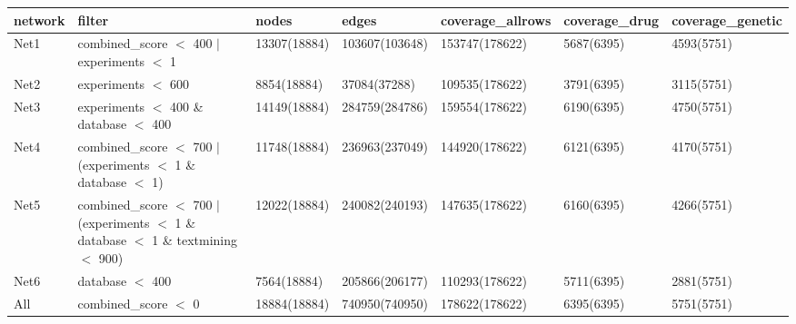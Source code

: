 \begin{table}[ht]
\centering
\begin{tabular}{lllllll}
  \hline
network & filter & nodes & edges & coverage\_allrows & coverage\_drug & coverage\_genetic \\ 
  \hline
Net1 & combined\_score $<$ 400 $|$ experiments $<$ 1 & 13307(18884) & 103607(103648) & 153747(178622) & 5687(6395) & 4593(5751) \\ 
  Net2 & experiments $<$ 600 & 8854(18884) & 37084(37288) & 109535(178622) & 3791(6395) & 3115(5751) \\ 
  Net3 & experiments $<$ 400 \& database $<$ 400 & 14149(18884) & 284759(284786) & 159554(178622) & 6190(6395) & 4750(5751) \\ 
  Net4 & combined\_score $<$ 700 $|$ (experiments $<$ 1 \& database $<$ 1) & 11748(18884) & 236963(237049) & 144920(178622) & 6121(6395) & 4170(5751) \\ 
  Net5 & combined\_score $<$ 700 $|$ (experiments $<$ 1 \& database $<$ 1 \& textmining $<$ 900) & 12022(18884) & 240082(240193) & 147635(178622) & 6160(6395) & 4266(5751) \\ 
  Net6 & database $<$ 400 & 7564(18884) & 205866(206177) & 110293(178622) & 5711(6395) & 2881(5751) \\ 
  All & combined\_score $<$ 0 & 18884(18884) & 740950(740950) & 178622(178622) & 6395(6395) & 5751(5751) \\ 
   \hline
\end{tabular}
\end{table}
